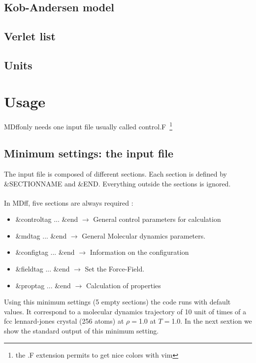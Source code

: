 \documentclass[a4paper]{article}
\newcommand{\MDFF}{{\sc MDff}}
\begin{document}
\subsection{Kob-Andersen model\label{sec:KA}}

\subsection{Verlet list\label{sec:vnlist}}

\subsection{Units \label{sec:units}}


\section{Usage}

\MDFF only needs one input file usually called control.F~\footnote{the .F extension permits to get nice colors with vim} 

\subsection{Minimum settings: the input file}

The input file is composed of different sections. 
Each section is defined by  \&SECTIONNAME and \&END.
Everything outside the sections is ignored.
\\
\\
In \MDFF, five sections are always required :

\begin{itemize}
\item \&controltag ... \&end $\rightarrow$ General control parameters for calculation 
\item \&mdtag ... \&end      $\rightarrow$ General Molecular dynamics parameters.
\item \&configtag ... \&end  $\rightarrow$ Information on the configuration
\item \&fieldtag ... \&end   $\rightarrow$ Set the Force-Field.
\item \&proptag ... \&end    $\rightarrow$ Calculation of properties
\end{itemize}


Using this minimum settings (5 empty sections) the code runs with default values.
It correspond to a molecular dynamics trajectory of 10 unit of times of a fcc lennard-jones 
crystal (256 atoms) at $\rho=$1.0 at $T=$1.0. In the next sextion we show the standard output of this minimum setting. 
\end{document}
